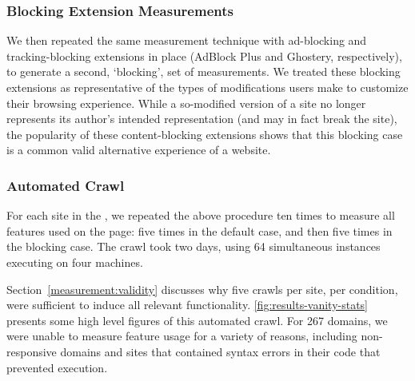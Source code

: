 \subsubsection{Blocking Extension Measurements}
\label{measurement:methodology:blocking-case-measurements} We then repeated the
same measurement technique with ad-blocking and tracking-blocking extensions in
place (AdBlock Plus and Ghostery, respectively), to generate a second,
`blocking', set of measurements. We treated these blocking extensions as
representative of the types of modifications users make to customize their
browsing experience. While a so-modified version of a site no longer represents
its author's intended representation (and may in fact break the site), the
popularity of these content-blocking extensions shows that this blocking case
is a common valid alternative experience of a website.


\subsubsection{Automated Crawl}
\label{measurement:methodology:automated-crawl}

For each site in the \ATK, we repeated the above procedure ten times to
measure all features used on the page: five times in the default
case, and then five times in the blocking case.  The crawl took two days, using
64 simultaneous \FF instances executing on four machines.

Section~\ref{measurement:validity} discusses why five crawls per site, per
condition, were sufficient to induce all relevant functionality.
\ref{fig:results-vanity-stats} presents some high level figures of this
automated crawl.  For 267 domains, we were unable to measure feature usage for
a variety of reasons, including non-responsive domains and sites that contained
syntax errors in their \JS code that prevented execution.

